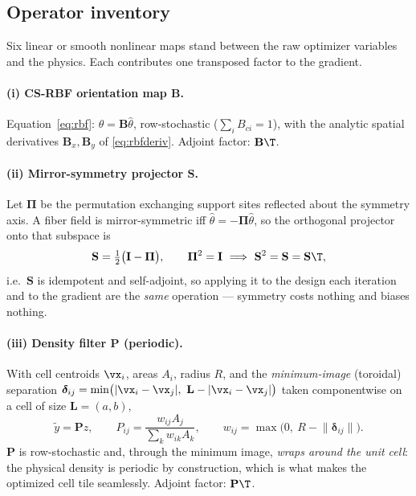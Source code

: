 \documentclass[11pt]{article}
\begin{document}
\subsection{Operator inventory}
\label{sec:algo:ops}
Six linear or smooth nonlinear maps stand between the raw optimizer variables and
the physics. Each contributes one transposed factor to the gradient.

\paragraph{(i) CS-RBF orientation map $\mathbf B$.}
Equation~\eqref{eq:rbf}: $\theta=\mathbf B\hat\theta$, row-stochastic
($\sum_i B_{ci}=1$), with the analytic spatial derivatives
$\mathbf B_x,\mathbf B_y$ of \eqref{eq:rbfderiv}. Adjoint factor: $\mathbf B\T$.

\paragraph{(ii) Mirror-symmetry projector $\mathbf S$.}
Let $\bm\Pi$ be the permutation exchanging support sites reflected about the
symmetry axis. A fiber field is mirror-symmetric iff
$\hat\theta=-\bm\Pi\hat\theta$, so the orthogonal projector onto that subspace is
\begin{equation}
  \mathbf S=\tfrac12\bigl(\mathbf I-\bm\Pi\bigr),\qquad
  \bm\Pi^2=\mathbf I\ \Longrightarrow\
  \mathbf S^2=\mathbf S=\mathbf S\T ,
  \label{eq:sym}
\end{equation}
i.e.\ $\mathbf S$ is idempotent and self-adjoint, so applying it to the design
each iteration and to the gradient are the \emph{same} operation --- symmetry
costs nothing and biases nothing.

\paragraph{(iii) Density filter $\mathbf P$ (periodic).}
With cell centroids $\vx_i$, areas $A_i$, radius $R$, and the \emph{minimum-image}
(toroidal) separation $\bm\delta_{ij}=\min\bigl(|\vx_i-\vx_j|,\ \mathbf L-|\vx_i-
\vx_j|\bigr)$ taken componentwise on a cell of size $\mathbf L=(a,b)$,
\begin{equation}
  \tilde y=\mathbf Pz,\qquad
  P_{ij}=\frac{w_{ij}A_j}{\sum_k w_{ik}A_k},\qquad
  w_{ij}=\max\bigl(0,\ R-\lVert\bm\delta_{ij}\rVert\bigr).
  \label{eq:filter}
\end{equation}
$\mathbf P$ is row-stochastic and, through the minimum image, \emph{wraps around
the unit cell}: the physical density is periodic by construction, which is what
makes the optimized cell tile seamlessly. Adjoint factor: $\mathbf P\T$.
\end{document}
